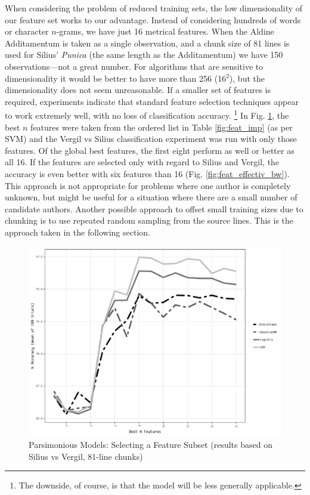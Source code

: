 \documentclass[11pt,a4paper]{scrartcl} %
\begin{document}
{When considering the problem of reduced training sets, the low dimensionality of our feature set works to our advantage. Instead of considering hundreds of words or character $n$-grams, we have just 16 metrical features. When the Aldine Additamentum is taken as a single observation, and a chunk size of 81 lines is used for Silius' \textit{Punica} (the same length as the Additamentum) we have 150 observations---not a great number. For algorithms that are sensitive to dimensionality it would be better to have more than 256 (16$^{2}$), but the dimensionality does not seem unreasonable. If a smaller set of features is required, experiments indicate that standard feature selection techniques appear to work extremely well, with no loss of classification accuracy.%
\footnote{The downside, of course, is that the model will be less generally applicable.}
In Fig. \ref{fig:glob_feat_sel}, the best $n$ features were taken from the ordered list in Table \ref{fig:feat_imp} (as per SVM) and the Vergil vs Silius classification experiment was run with only those features. Of the global best features, the first eight perform as well or better as all 16. If the features are selected only with regard to Silius and Vergil, the accuracy is even better with six features than 16 (Fig. \ref{fig:feat_effectiv_bw}). This approach is not appropriate for problems where one author is completely unknown, but might be useful for a situation where there are a small number of candidate authors. Another possible approach to offset small training sizes due to chunking is to use repeated random sampling from the source lines. This is the approach taken in the following section.

\begin{figure}
    \caption{Parsimonious Models: Selecting a Feature Subset (results based on Silius vs Vergil, 81-line chunks)}
    \label{fig:glob_feat_sel}
    \includegraphics[width=\textwidth]{feat_reduction.pdf}
\end{figure}

}
\end{document}
